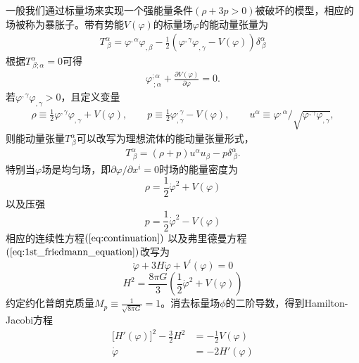 一般我们通过标量场来实现一个强能量条件$(\rho+3p > 0)$被破坏的模型，相应的场被称为暴胀子。带有势能$V(\varphi)$的标量场$\varphi$的能动量张量为
\begin{align}
  \label{eq:scalar-energy-momentum-tensor}
  T^{\alpha}_{\ \beta} = \varphi^{,\alpha}\varphi_{,\beta}-
  \frac{1}{2}{\left(\varphi^{,\gamma}\varphi_{,\gamma}-V(\varphi)\right)}\delta^{\alpha}_{\ \beta}
\end{align}
根据$T^{\alpha}_{\ \beta;\alpha}=0$可得
\begin{align}
  \varphi^{;\alpha}_{\ ;\alpha}+\frac{\partial V(\varphi)}{\partial\varphi}
  =0.
\end{align}
若$\varphi^{,\gamma}\varphi_{,\gamma}>0$，且定义变量
\begin{align}
  \rho \equiv
  \frac{1}{2}\varphi^{,\gamma}\varphi_{,\gamma}+V(\varphi),\qquad 
  p\equiv \frac{1}{2}\varphi^{,\gamma}_{,\gamma}-V(\varphi),\qquad
  u^{\alpha}\equiv \varphi^{,\alpha}/
  \sqrt{\varphi^{,\gamma}\varphi_{,\gamma}},
\end{align}
则能动量张量$T^{\alpha}_{\
\beta}$可以改写为理想流体的能动量张量形式，
\begin{align}
  \label{eq:perfect-fluid-energy-momentum-tensor}
  T^{\alpha}_{\ \beta}=(\rho+p)u^{\alpha}u_{\beta}-p\delta^{\alpha}_{\
  \beta}.
\end{align}
特别当$\varphi$场是均匀场，即$\partial\varphi /\partial x^{i}=0$时场的能量密度为
\begin{equation}\label{eq:energy_density}
  \rho = \frac{1}{2}\dot{\varphi}^2+V(\varphi)
\end{equation}
以及压强
\begin{equation}\label{eq:pressure}
  p=\frac{1}{2}\dot{\varphi}^2-V(\varphi)
\end{equation}
相应的连续性方程$(\ref{eq:continuation})$
以及弗里德曼方程$(\ref{eq:1st_friedmann_equation})$改写为
\begin{equation}
  \label{eq:continuation_in_inflation}
  \ddot{\varphi}+3H\dot\varphi+V^\prime(\varphi)=0
\end{equation}
\begin{equation}
  \label{eq:1st_friedmann_equation_in_inflation}
  H^2=\frac{8\pi G}{3}\left(\frac{1}{2}\dot\varphi^2+V(\varphi)\right)
\end{equation}
约定约化普朗克质量$M_p\equiv\frac{1}{\sqrt{8\pi G}}=1$。消去标量场$\phi$的二阶导数，得到Hamilton-Jacobi方程
\begin{align}
  \lbrack H'(\varphi)\rbrack^2 - \frac{3}{2}H^2 &=
  -\frac{1}{2}V(\varphi)\label{HJa} \\
  \dot\varphi  &= -2H'(\varphi)\label{HJb}
\end{align}

